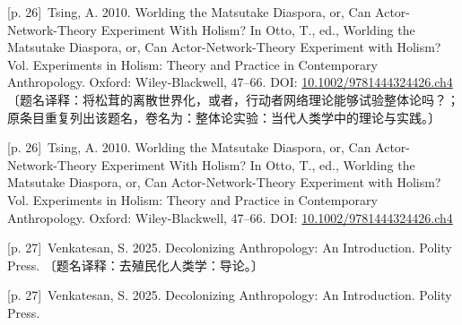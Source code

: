 \documentclass[10pt,a4paper]{article}
\begin{document}
\noindent\begin{minipage}{\textwidth}\begin{minipage}[t]{\dimexpr.5\textwidth-4mm\relax}\noindent\begin{minipage}[t]{\linewidth}{\scriptsize\color{gray} [p. 26]}\ Tsing, A. 2010. Worlding the Matsutake Diaspora, or, Can Actor-Network-Theory Experiment With Holism? In Otto, T., ed., Worlding the Matsutake Diaspora, or, Can Actor-Network-Theory Experiment with Holism? Vol. Experiments in Holism: Theory and Practice in Contemporary Anthropology. Oxford: Wiley-Blackwell, 47–66. DOI: \url{10.1002/9781444324426.ch4} 〔题名译释：将松茸的离散世界化，或者，行动者网络理论能够试验整体论吗？；原条目重复列出该题名，卷名为：整体论实验：当代人类学中的理论与实践。〕\par\end{minipage}\par\end{minipage}\hfill\begin{minipage}[t]{\dimexpr.5\textwidth-4mm\relax}\noindent\begin{minipage}[t]{\linewidth}{\scriptsize\color{gray} [p. 26]}\ Tsing, A. 2010. Worlding the Matsutake Diaspora, or, Can Actor-Network-Theory Experiment With Holism? In Otto, T., ed., Worlding the Matsutake Diaspora, or, Can Actor-Network-Theory Experiment with Holism? Vol. Experiments in Holism: Theory and Practice in Contemporary Anthropology. Oxford: Wiley-Blackwell, 47–66. DOI: \url{10.1002/9781444324426.ch4}\par\end{minipage}\par\end{minipage}\end{minipage}\par
\noindent\begin{minipage}{\textwidth}\begin{minipage}[t]{\dimexpr.5\textwidth-4mm\relax}\noindent\begin{minipage}[t]{\linewidth}{\scriptsize\color{gray} [p. 27]}\ Venkatesan, S. 2025. Decolonizing Anthropology: An Introduction. Polity Press. 〔题名译释：去殖民化人类学：导论。〕\par\end{minipage}\par\end{minipage}\hfill\begin{minipage}[t]{\dimexpr.5\textwidth-4mm\relax}\noindent\begin{minipage}[t]{\linewidth}{\scriptsize\color{gray} [p. 27]}\ Venkatesan, S. 2025. Decolonizing Anthropology: An Introduction. Polity Press.\par\end{minipage}\par\end{minipage}\end{minipage}\par
\end{document}
